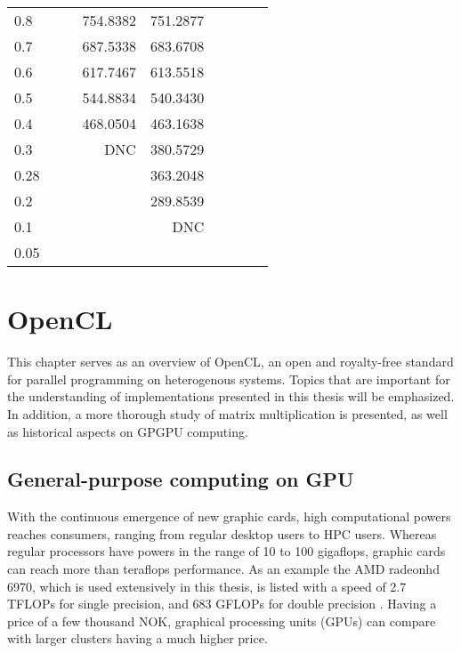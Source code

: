 \begin{landscape}
\begin{table}
\begin{center}
\begin{tabular}{l|rrrrrrrr}
0.8 &			&			&  754.8382 &  751.2877  \\ 
0.7 &			&			&  687.5338 &  683.6708  \\ 
0.6 &			&			&  617.7467 &  613.5518  \\ 
0.5 &			&			&  544.8834 &  540.3430  \\ 
0.4 &			&			&  468.0504 &  463.1638  \\ 
0.3 &			&			&       DNC &  380.5729  \\ 
0.28 &			&			&			&  363.2048  \\ 
0.2 &			&			&			&  289.8539  \\ 
0.1 &			&			&			&       DNC  \\ 
0.05 &  \\
\hline \hline
\end{tabular}
\end{center}
\end{table}
\end{landscape}



















\chapter{OpenCL}
\label{ch:OpenCL}
This chapter serves as an overview of OpenCL, an open and royalty-free standard for parallel programming on heterogenous systems.
Topics that are important for the understanding of implementations presented in this thesis will be emphasized.
In addition, a more thorough study of matrix multiplication is presented, as well as historical aspects on GPGPU computing.


\section{General-purpose computing on GPU}
With the continuous emergence of new graphic cards, high computational powers reaches consumers, ranging from regular desktop users to HPC users.
Whereas regular processors have powers in the range of 10 to 100 gigaflops, graphic cards can reach more than teraflops performance.
As an example the AMD radeonhd 6970, which is used extensively in this thesis, is listed with a speed of 2.7 TFLOPs for single precision, and 683 GFLOPs for double precision \cite{radeon6970}.
Having a price of a few thousand NOK, graphical processing units (GPUs) can compare with larger clusters having a much higher price.

